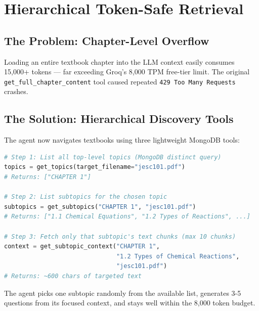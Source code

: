 \documentclass[12pt, a4paper]{article}
\begin{document}
\newpage
\section{Hierarchical Token-Safe Retrieval}

\subsection{The Problem: Chapter-Level Overflow}
Loading an entire textbook chapter into the LLM context easily consumes 15,000+ tokens — far exceeding Groq's 8,000 TPM free-tier limit. The original \texttt{get\_full\_chapter\_content} tool caused repeated \texttt{429 Too Many Requests} crashes.

\subsection{The Solution: Hierarchical Discovery Tools}
The agent now navigates textbooks using three lightweight MongoDB tools:
\begin{lstlisting}[language=Python, caption=Hierarchical Discovery Flow]
# Step 1: List all top-level topics (MongoDB distinct query)
topics = get_topics(target_filename="jesc101.pdf")
# Returns: ["CHAPTER 1"]

# Step 2: List subtopics for the chosen topic
subtopics = get_subtopics("CHAPTER 1", "jesc101.pdf")
# Returns: ["1.1 Chemical Equations", "1.2 Types of Reactions", ...]

# Step 3: Fetch only that subtopic's text chunks (max 10 chunks)
context = get_subtopic_context("CHAPTER 1",
                               "1.2 Types of Chemical Reactions",
                               "jesc101.pdf")
# Returns: ~600 chars of targeted text
\end{lstlisting}

The agent picks one subtopic randomly from the available list, generates 3-5 questions from its focused context, and stays well within the 8,000 token budget.
\end{document}
